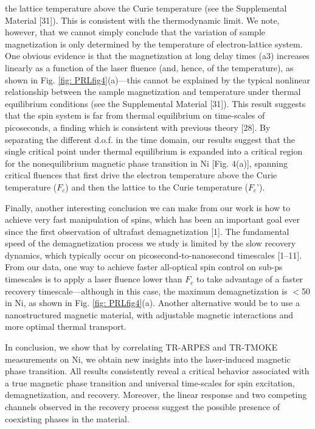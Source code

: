 the lattice temperature above the Curie temperature (see the Supplemental Material [31]). This is consistent with the thermodynamic limit. We note, however, that we cannot simply conclude that the variation of sample magnetization is only determined by the temperature of electron-lattice system. One obvious evidence is that the magnetization at long delay times (a3) increases linearly as a function of the laser fluence (and, hence, of the temperature), as shown in Fig. \ref{fig: PRLfig4}(a)—this cannot be explained by the typical nonlinear relationship between the sample magnetization and temperature under thermal equilibrium conditions (see the Supplemental Material [31]). This result suggests that the spin system is far from thermal equilibrium on time-scales of picoseconds, a finding which is consistent with previous theory [28]. By separating the different d.o.f. in the time domain, our results suggest that the single critical point under thermal equilibrium is expanded into a critical region for the nonequilibrium magnetic phase transition in Ni [Fig. 4(a)], spanning critical fluences that first drive the electron temperature above the Curie temperature ($F_c$) and then the lattice to the Curie temperature ($F_c$').

Finally, another interesting conclusion we can make from our work is how to achieve very fast manipulation of spins, which has been an important goal ever since the first observation of ultrafast demagnetization [1]. The fundamental speed of the demagnetization process we study is limited by the slow recovery dynamics, which typically occur on picosecond-to-nanosecond timescales [1–11]. From our data, one way to achieve faster all-optical spin control on sub-ps timescales is to apply a laser fluence lower than $F_c$
to take advantage of a faster recovery timescale—although in this case, the maximum demagnetization is $<$50 in Ni, as shown in Fig. \ref{fig: PRLfig4}(a). Another alternative would be to use a nanostructured magnetic material, with adjustable magnetic interactions and more optimal thermal transport.

In conclusion, we show that by correlating TR-ARPES and TR-TMOKE measurements on Ni, we obtain new insights into the laser-induced magnetic phase transition. All results consistently reveal a critical behavior associated with a true magnetic phase transition and universal time-scales for spin excitation, demagnetization, and recovery. Moreover, the linear response and two competing channels observed in the recovery process suggest the possible presence of coexisting phases in the material.

